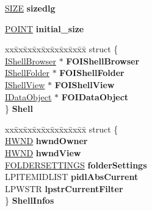 \begin{DoxyCompactItemize}
\hyperlink{structtag_s_i_z_e}{S\+I\+ZE} {\bfseries sizedlg}
\item 
\mbox{\label{struct_file_open_dlg_infos_aa66144c703ae4c9f319d68ed3b8ce6b0}} 
\hyperlink{structtag_p_o_i_n_t}{P\+O\+I\+NT} {\bfseries initial\+\_\+size}
\item 
\mbox{\label{struct_file_open_dlg_infos_af7a9ae15a314330a0cf08b6234014d30}} 
\begin{tabbing}
xx\=xx\=xx\=xx\=xx\=xx\=xx\=xx\=xx\=\kill
struct \{\\
\>\hyperlink{interface_i_shell_browser}{IShellBrowser} $\ast$ {\bfseries FOIShellBrowser}\\
\>\hyperlink{interface_i_shell_folder}{IShellFolder} $\ast$ {\bfseries FOIShellFolder}\\
\>\hyperlink{interface_i_shell_view}{IShellView} $\ast$ {\bfseries FOIShellView}\\
\>\hyperlink{interface_i_data_object}{IDataObject} $\ast$ {\bfseries FOIDataObject}\\
\} {\bfseries Shell}\\

\end{tabbing}\item 
\mbox{\label{struct_file_open_dlg_infos_aefa3cd044584107a1a2dd0d1591f2c90}} 
\begin{tabbing}
xx\=xx\=xx\=xx\=xx\=xx\=xx\=xx\=xx\=\kill
struct \{\\
\>\hyperlink{interfacevoid}{HWND} {\bfseries hwndOwner}\\
\>\hyperlink{interfacevoid}{HWND} {\bfseries hwndView}\\
\>\hyperlink{struct_f_o_l_d_e_r_s_e_t_t_i_n_g_s}{FOLDERSETTINGS} {\bfseries folderSettings}\\
\>LPITEMIDLIST {\bfseries pidlAbsCurrent}\\
\>LPWSTR {\bfseries lpstrCurrentFilter}\\
\} {\bfseries ShellInfos}\\


\end{tabbing}
\end{DoxyCompactItemize}
